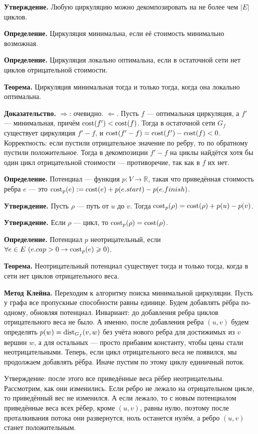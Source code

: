 \textbf{Утверждение.} Любую циркуляцию можно декомпозировать на не более чем $|E|$ циклов.

\textbf{Определение.} Циркуляция минимальна, если её стоимость минимально возможная.

\textbf{Определение.} Циркуляция локально оптимальна, если в остаточной сети нет циклов отрицательной стоимости.

\textbf{Теорема.} Циркуляция минимальная тогда и только тогда, когда она локально оптимальна.

\textbf{Доказательство.} $\Rightarrow$: очевидно. 
$\Leftarrow$. Пусть $f$ --- оптимальная циркуляция, а $f'$ --- минимальная, причём $\operatorname{cost}(f') < \operatorname{cost}(f)$.
Тогда в остаточной сети $G_f$ существует циркуляция $f' - f$, и $\operatorname{cost}(f' - f) = \operatorname{cost}(f') - \operatorname{cost}(f) < 0$.
Корректность: если пустили отрицательное значение по ребру, то по обратному пустили положительное.
Тогда в декомпозиции $f' - f$ на циклы найдётся хотя бы один цикл отрицательной стоимости --- противоречие, так как в $f$ их нет.

\textbf{Определение.} Потенциал --- функция $p: V \to \mathbb R$, такая что приведённая стоимость ребра $e$ --- это $\operatorname{cost}_p(e) := \operatorname{cost}(e) + p(e.start) - p(e.finish)$.

\textbf{Утверждение.} Пусть $\rho$ --- путь от $u$ до $v$. Тогда $\operatorname{cost}_p(\rho) = \operatorname{cost}(\rho) + p(u) - p(v)$.

\textbf{Утверждение.} Если $\rho$ --- цикл, то $\operatorname{cost}_p(\rho) = \operatorname{cost}(\rho)$.

\textbf{Определение.} Потенциал $p$ неотрицательный, если $\forall e \in E~(e.cap > 0 \rightarrow \operatorname{cost}_p(e) \geqslant 0)$.

\textbf{Теорема.} Неотрицательный потенциал существует тогда и только тогда, когда в сети нет циклов отрицательного веса.

\textbf{Метод Клейна.}
Переходим к алгоритму поиска минимальной циркуляции. Пусть у графа все пропускные способности равны единице.
Будем добавлять рёбра по-одному, обновляя потенциал.
Инвариант: до добавления ребра циклов отрицательного веса не было.
А именно, после добавления ребра $(u, v)$ будем определять $p(w) = \operatorname{dist}_{G_f}(v, w)$ без учёта нового ребра для достижимых из $v$ вершин $w$, а для остальных --- просто прибавим константу, чтобы цены стали неотрицательными.
Теперь, если цикл отрицательного веса не появился, мы продолжаем добавлять рёбра.
Иначе пустим по этому циклу единичный поток.

Утверждение: после этого все приведённые веса рёбер неотрицательны.
Рассмотрим, как они изменились.
Если ребро не лежало на отрицательном цикле, то приведённый вес не изменился.
А если лежало, то с новым потенциалом приведённые веса всех рёбер, кроме $(u, v)$, равны нулю, поэтому после проталкивания потока они развернутся, ноль останется нулём, а ребро $(u, v)$ станет положительным.

